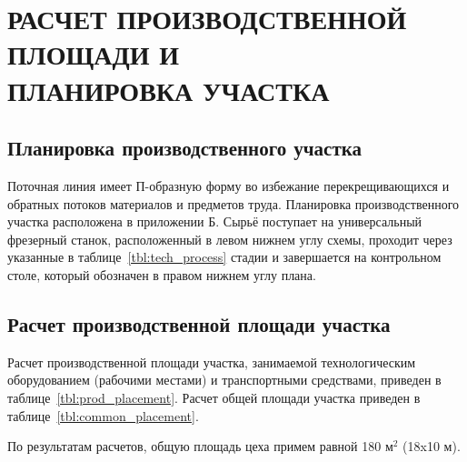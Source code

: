 \section[
Расчет производственной площади и планировка участка]{
РАСЧЕТ ПРОИЗВОДСТВЕННОЙ ПЛОЩАДИ И \\
ПЛАНИРОВКА УЧАСТКА
}
\label{sec:placement}

\subsection{Планировка производственного участка}

Поточная линия имеет П-образную форму во избежание перекрещивающихся и
обратных потоков материалов и предметов труда.
Планировка производственного участка расположена в приложении Б.
Сырьё поступает на универсальный фрезерный станок, 
расположенный в  левом нижнем углу схемы, 
проходит через указанные в таблице~\ref{tbl:tech_process} стадии и
завершается на контрольном столе, который обозначен в правом нижнем углу плана.

\subsection{Расчет производственной площади участка}

Расчет производственной площади участка, занимаемой технологическим оборудованием
(рабочими местами) и транспортными средствами, 
приведен в таблице~\ref{tbl:prod_placement}.
Расчет общей площади участка приведен в таблице~\ref{tbl:common_placement}.

По результатам расчетов, общую площадь цеха примем равной
180 \( \text{м}^2 \) (18x10 м).

